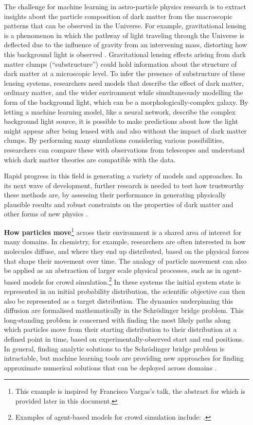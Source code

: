 The challenge for machine learning in astro-particle physics research is
to extract insights about the particle composition of dark matter from
the macroscopic patterns that can be observed in the Universe. For
example, gravitational lensing is a phenomenon in which the pathway of
light traveling through the Universe is deflected due to the influence
of gravity from an intervening mass, distorting how this background
light is observed \cite{Mishra-strong22}. Gravitational lensing
effects arising from dark matter clumps (``substructure'') could hold
information about the structure of dark matter at a microscopic level.
To infer the presence of substructure of these lensing systems,
researchers need models that describe the effect of dark matter,
ordinary matter, and the wider environment while simultaneously
modelling the form of the background light, which can be a
morphologically-complex galaxy. By letting a machine learning model,
like a neural network, describe the complex background light source, it
is possible to make predictions about how the light might appear after
being lensed with and also without the impact of dark matter clumps. By
performing many simulations considering various possibilities,
researchers can compare these with observations from telescopes and
understand which dark matter theories are compatible with the data.

Rapid progress in this field is generating a variety of models and
approaches. In its next wave of development, further research is needed
to test how trustworthy these methods are, by assessing their
performance in generating physically plausible results and robust
constraints on the properties of dark matter and other forms of new
physics \cite{Dworkin-cosmology22}.

\noindent\textbf{How particles move}\footnote{This example is inspired by
  Francisco Vargas's talk, the abstract for which is provided later in
  this document.} across their environment is a shared area of interest
for many domains. In chemistry, for example, researchers are often
interested in how molecules diffuse, and where they end up distributed,
based on the physical forces that shape their movement over time. The
analogy of particle movement can also be applied as an abstraction of
larger scale physical processes, such as in agent-based models for crowd
simulation.\footnote{Examples of agent-based models for crowd simulation
  include: \cite{Makinoshima-crowd22,Malleson-simulating20}.} In these systems the initial system state is
represented in an initial probability distribution, the scientific
objective can then also be represented as a target distribution. The
dynamics underpinning this diffusion are formalised mathematically in
the Schrödinger bridge problem. This long-standing problem is concerned
with finding the most likely paths along which particles move from their
starting distribution to their distribution at a defined point in time,
based on experimentally-observed start and end positions. In general,
finding analytic solutions to the Schrödinger bridge problem is
intractable, but machine learning tools are providing new approaches for
finding approximate numerical solutions that can be deployed across
domains \cite{Vargas-solving21}.

